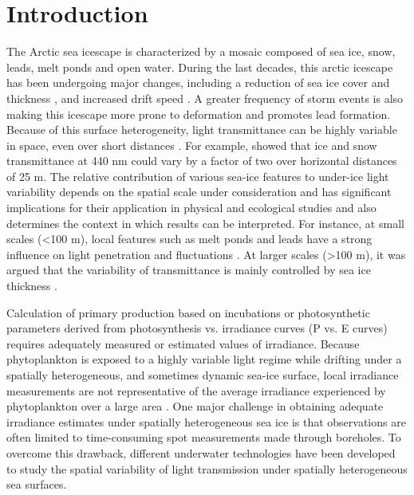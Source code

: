 \section{Introduction}

The Arctic sea icescape is characterized by a mosaic composed of sea ice, snow, leads, melt ponds and open water. During the last decades, this arctic icescape has been undergoing major changes, including a reduction of sea ice cover and thickness \citep{Meier2014}, and increased drift speed \citep{Kwok2013}. A greater frequency of storm events is also making this icescape more prone to deformation \citep{Itkin2017} and promotes lead formation. Because of this surface heterogeneity, light transmittance can be highly variable in space, even over short distances \citep{Nicolaus2013b, Katlein2015, Hancke2018}. For example, \citet{Perovich1998} showed that ice and snow transmittance at 440 nm could vary by a factor of two over horizontal distances of 25 m. The relative contribution of various sea-ice features to under-ice light variability depends on the spatial scale under consideration and has significant implications for their application in physical and ecological studies and also determines the context in which results can be interpreted. For instance, at small scales (\textless 100 m), local features such as melt ponds and leads have a strong influence on light penetration and fluctuations \citep{Frey2011, Katlein2016, Massicotte2018}. At larger scales (\textgreater 100 m), it was argued that the variability of transmittance is mainly controlled by sea ice thickness \citep{Katlein2015}.

Calculation of primary production based on incubations or photosynthetic parameters derived from photosynthesis vs. irradiance curves (P vs. E curves) requires adequately measured or estimated values of irradiance. Because phytoplankton is exposed to a highly variable light regime while drifting under a spatially heterogeneous, and sometimes dynamic sea-ice surface, local irradiance measurements are not representative of the average irradiance experienced by phytoplankton over a large area \citep{Katlein2016, Lange2017}. One major challenge in obtaining adequate irradiance estimates under spatially heterogeneous sea ice is that observations are often limited to time-consuming spot measurements made through boreholes. To overcome this drawback, different underwater technologies have been developed to study the spatial variability of light transmission under spatially heterogeneous sea surfaces. 

